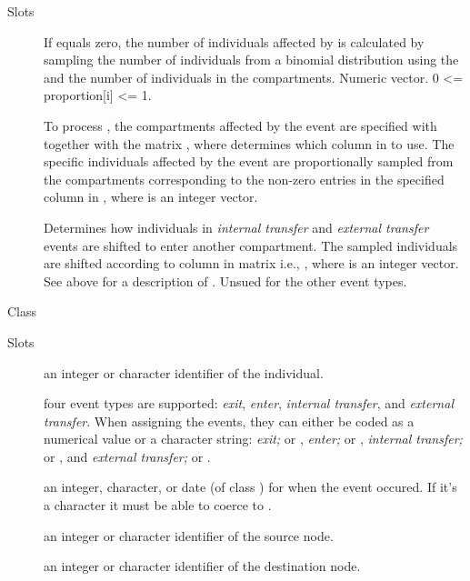 \documentclass[letterpaper]{book}
\begin{document}
\begin{Section}{Slots}
\begin{description}
\item[] If  equals zero, the number of
individuals affected by  is calculated by
sampling the number of individuals from a binomial
distribution using the  and the number of
individuals in the compartments. Numeric vector.  0 <=
proportion[i] <= 1.

\item[] To process , the compartments affected
by the event are specified with  together with
the matrix , where  determines which
column in  to use.  The specific individuals affected
by the event are proportionally sampled from the compartments
corresponding to the non-zero entries in the specified column
in , where  is an integer
vector.

\item[] Determines how individuals in \emph{internal transfer}
and \emph{external transfer} events are shifted to enter
another compartment.  The sampled individuals are shifted
according to column  in matrix  i.e.,
, where  is an integer vector.
See above for a description of . Unsued for the other
event types.

\end{description}
\end{Section}
%
\begin{Description}
Class 
\end{Description}
%
\begin{Section}{Slots}

\begin{description}

\item[] an integer or character identifier of the individual.

\item[] four event types are supported: \emph{exit},
\emph{enter}, \emph{internal transfer}, and \emph{external
transfer}.  When assigning the events, they can either be
coded as a numerical value or a character string: \emph{exit;}
 or , \emph{enter;}  or
, \emph{internal transfer;}  or
, and \emph{external transfer;}  or
.

\item[] an integer, character, or date (of class )
for when the event occured. If it's a character it must be
able to coerce to .

\item[] an integer or character identifier of the source node.

\item[] an integer or character identifier of the destination
node.

\end{description}
\end{Section}
\end{document}
